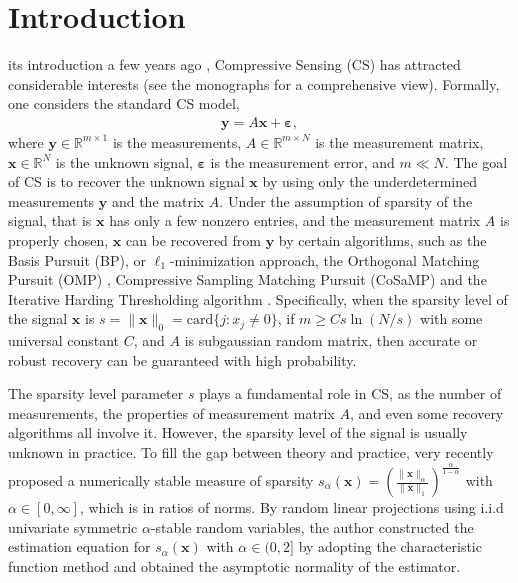 \documentclass[journal,onecolumn]{IEEEtran}
\begin{document}
\section{Introduction}
%
%
%
%

 its introduction a few years ago \cite{crt,ct1,ct2,d}, Compressive Sensing (CS) has attracted considerable interests (see the monographs \cite{ek,fr} for a comprehensive view). Formally, one considers the standard CS model, \begin{align}
\mathbf{y}=A\mathbf{x}+\boldsymbol{\varepsilon}, \label{1.1}
\end{align}
where $\mathbf{y}\in\mathbb{R}^{m\times 1}$ is the measurements, $A\in\mathbb{R}^{m\times N}$ is the measurement matrix, $\mathbf{x}\in\mathbb{R}^N$ is the unknown signal, $\boldsymbol{\varepsilon}$ is the measurement error, and $m\ll N$. The goal of CS is to recover the unknown signal $\mathbf{x}$ by using only the underdetermined measurements $\mathbf{y}$ and the matrix $A$. Under the assumption of sparsity of the signal, that is $\mathbf{x}$ has only a few nonzero entries, and the measurement matrix $A$ is properly chosen, $\mathbf{x}$ can be recovered from $\mathbf{y}$ by certain algorithms, such as the Basis Pursuit (BP), or $\ell_1$-minimization approach, the Orthogonal Matching Pursuit (OMP) \cite{tg}, Compressive Sampling Matching Pursuit (CoSaMP) \cite{nt} and the Iterative Harding Thresholding algorithm \cite{bd1}. Specifically, when the sparsity level of the signal $\mathbf{x}$ is $s=\lVert\mathbf{x}\rVert_0=\mathrm{card}\{j:x_j\neq 0\}$, if $m\geq Cs\ln(N/s)$ with some universal constant $C$, and $A$ is subgaussian random matrix, then accurate or robust recovery can be guaranteed with high probability.

The sparsity level parameter $s$ plays a fundamental role in CS, as the number of measurements, the properties of measurement matrix $A$, and even some recovery algorithms all involve it. However, the sparsity level of the signal is usually unknown in practice. To fill the gap between theory and practice,
very recently \cite{l1,l2} proposed a numerically stable measure of sparsity $s_\alpha(\mathbf{x})=\left(\frac{\lVert\mathbf{x}\rVert_{\alpha}}{\lVert\mathbf{x}\rVert_{1}}\right)^{\frac{\alpha}{1-\alpha}}$ with $\alpha\in[0,\infty]$,
which is in ratios of norms. By random linear projections using i.i.d univariate symmetric $\alpha$-stable random variables, the author constructed the estimation equation for $s_{\alpha}(\mathbf{x})$ with $\alpha\in(0,2]$ by adopting the characteristic function method and obtained the asymptotic normality of the estimator.
\end{document}
